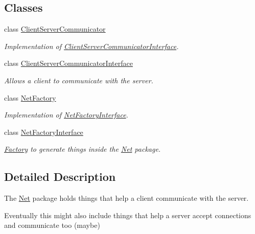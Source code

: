 \subsection*{Classes}
\begin{DoxyCompactItemize}
\item 
class \hyperlink{classAsteroids_1_1Domain_1_1Net_1_1ClientServerCommunicator}{Client\+Server\+Communicator}
\begin{DoxyCompactList}\small\item\em Implementation of \hyperlink{classAsteroids_1_1Domain_1_1Net_1_1ClientServerCommunicatorInterface}{Client\+Server\+Communicator\+Interface}. \end{DoxyCompactList}\item 
class \hyperlink{classAsteroids_1_1Domain_1_1Net_1_1ClientServerCommunicatorInterface}{Client\+Server\+Communicator\+Interface}
\begin{DoxyCompactList}\small\item\em Allows a client to communicate with the server. \end{DoxyCompactList}\item 
class \hyperlink{classAsteroids_1_1Domain_1_1Net_1_1NetFactory}{Net\+Factory}
\begin{DoxyCompactList}\small\item\em Implementation of \hyperlink{classAsteroids_1_1Domain_1_1Net_1_1NetFactoryInterface}{Net\+Factory\+Interface}. \end{DoxyCompactList}\item 
class \hyperlink{classAsteroids_1_1Domain_1_1Net_1_1NetFactoryInterface}{Net\+Factory\+Interface}
\begin{DoxyCompactList}\small\item\em \hyperlink{namespaceAsteroids_1_1Domain_1_1Factory}{Factory} to generate things inside the \hyperlink{namespaceAsteroids_1_1Domain_1_1Net}{Net} package. \end{DoxyCompactList}\end{DoxyCompactItemize}


\subsection{Detailed Description}
The \hyperlink{namespaceAsteroids_1_1Domain_1_1Net}{Net} package holds things that help a client communicate with the server. 

Eventually this might also include things that help a server accept connections and communicate too (maybe) 
